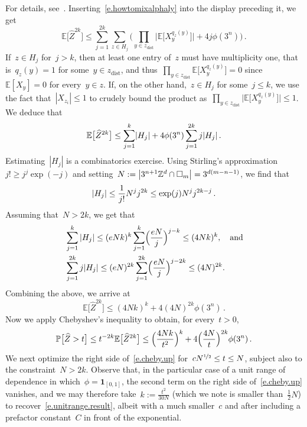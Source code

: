 \documentclass[11pt,twoside]{article} %
\let\oldsquare\square %
\renewcommand{\square}{\oldsquare}
\numberwithin{equation}{section}
\theoremstyle{definition}
\let\originalleft\left
\let\originalright\right
\renewcommand{\left}{\mathopen{}\mathclose\bgroup\originalleft}
\renewcommand{\right}{\aftergroup\egroup\originalright}
\newcommand*{\Zd}{\ensuremath{\mathbb{Z}^d}}
\renewcommand*{\hat}{\widehat}
\newcommand{\cu}{\square}
\renewcommand{\P}{\mathbb{P}}
\newcommand{\E}{\mathbb{E}}
\newcommand{\indc}{\boldsymbol{1}}
\begin{document}
For details, see~\cite[Appendix A]{AM}.
Inserting~\eqref{e.howtomixalphaly} into the display preceding it, we get 
\begin{equation*} \label{}
\E \bigl[ \hat{Z}^{2k} \bigr]
\leq 
\sum_{j=1}^{2k} \sum_{z \in H_j} \biggl( \prod_{y \in z_{\mathrm{dist}}} \bigl | \E \bigl[ X_{y}^{q_z(y)} \bigr] \bigr| + 4 j\phi(3^n) \biggr) \, . 
\end{equation*}
If~$z \in H_j$ for~$j>k$, then at least one entry of~$z$ must have multiplicity one, that is~$q_z(y) = 1$ for some~$y \in z_{\mathrm{dist}}$, and thus~$\prod_{y \in z_{\mathrm{dist}}}  \E \bigl[  X_{y}^{q_z(y)} \bigr]   =0$ since~$\E[X_y] = 0$ for every~$y \in z$. If, on the other hand,~$z \in H_j$ for some~$j\leq k$, we use the fact that~$|X_{z_i}| \leq 1$ to crudely bound  the product as~$\prod_{y \in z_{\mathrm{dist}}} \big| \E \bigl[  X_{y}^{q_z(y)} \bigr] \big|  \leq 1$.
We deduce that 
\begin{equation*} \label{}
\E \bigl[ \hat{Z}^{2k} \bigr]
\leq 
\sum_{j=1}^{k} \left| H_j \right| + 4 \phi(3^n) \sum_{j=1}^{2k} j \left| H_j \right|
\,.
\end{equation*}
Estimating~$|H_j|$ is a combinatorics exercise. Using Stirling's approximation~$j!\geq j^j \exp(-j)$ and setting~$N:=\left| 3^{n+1}\Zd\cap \cu_m\right| = 3^{d(m-n-1)}$, we find that
\begin{equation*} \label{}
\left| H_j \right| 
\leq \frac1{j!} N^jj^{2k}
\leq \exp(j) N^j j^{2k-j}
\,.
\end{equation*}
Assuming that~$N>2k$, we get that 
\begin{equation*} \label{}
\begin{aligned}
&
\sum_{j=1}^k |H_j| 
\leq 
(e N k)^k \sum_{j=1}^k \Bigl(  \frac{e N }{j}   \Bigr)^{j-k} 
\leq (4 Nk)^k,
\quad\mbox{and} 
\\ & 
\sum_{j=1}^{2k} j |H_j| 
\leq 
(e N)^{2k} \sum_{j=1}^{2k} \Bigl(  \frac{e N }{j}   \Bigr)^{j-2k}
\leq (4 N)^{2k}. 
\end{aligned} 
\end{equation*}
Combining the above, we arrive at
\begin{equation*} \label{}
\E \bigl[ \hat{Z}^{2k} \bigr]
\leq 
(4Nk)^k 
+ 
4 (4N)^{2k} \phi(3^n)
\,.
\end{equation*}
Now we apply Chebyshev's inequality to obtain, for every~$t >0$, 
\begin{equation} 
\label{e.cheby.up}
\P \bigl[  \hat{Z} > t \bigr]
\leq 
t^{-2k} \E \bigl[ \hat{Z}^{2k} \bigr] 
\leq 
\Bigl(\frac{4Nk}{t^2}\Bigr)^k 
+ 
4 \Bigl( \frac{4N}{t} \Bigr)^{2k} \phi(3^n)
\,.
\end{equation}
We next optimize the right side of~\eqref{e.cheby.up} for~$cN^{\nicefrac12} \leq t \leq N$, subject also to the constraint~$N>2k$. 
Observe that, in the particular case of a unit range of dependence in which~$\phi=\indc_{[0,1]}$, the second term on the right side of~\eqref{e.cheby.up} vanishes, and we may therefore take~$k:= \frac{t^2}{30N}$ (which we note is smaller than~$\frac12N$) to recover~\eqref{e.unitrange.result},  albeit with a much smaller~$c$ and after including a prefactor constant~$C$ in front of the exponential. 
\end{document}
